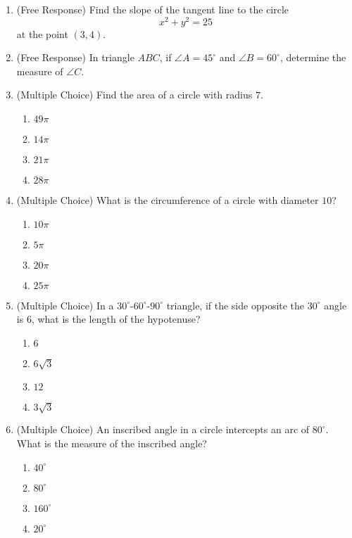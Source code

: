 \documentclass[12pt]{article}
\begin{document}
\begin{enumerate}[label=\textbf{Question \arabic*:}]
  \item (Free Response) Find the slope of the tangent line to the circle
    \[
    x^2 + y^2 = 25
    \]
    at the point \((3,4)\).
    
  \item (Free Response) In triangle \(ABC\), if \(\angle A = 45^\circ\) and \(\angle B = 60^\circ\), determine the measure of \(\angle C\).

  \item (Multiple Choice) Find the area of a circle with radius \(7\).
    \begin{enumerate}[label=(\Alph*)]
      \item \(49\pi\)
      \item \(14\pi\)
      \item \(21\pi\)
      \item \(28\pi\)
    \end{enumerate}
  
  \item (Multiple Choice) What is the circumference of a circle with diameter \(10\)?
    \begin{enumerate}[label=(\Alph*)]
      \item \(10\pi\)
      \item \(5\pi\)
      \item \(20\pi\)
      \item \(25\pi\)
    \end{enumerate}
  
  \item (Multiple Choice) In a \(30^\circ\text{-}60^\circ\text{-}90^\circ\) triangle, if the side opposite the \(30^\circ\) angle is \(6\), what is the length of the hypotenuse?
    \begin{enumerate}[label=(\Alph*)]
      \item \(6\)
      \item \(6\sqrt{3}\)
      \item \(12\)
      \item \(3\sqrt{3}\)
    \end{enumerate}
  
  \item (Multiple Choice) An inscribed angle in a circle intercepts an arc of \(80^\circ\). What is the measure of the inscribed angle?
    \begin{enumerate}[label=(\Alph*)]
      \item \(40^\circ\)
      \item \(80^\circ\)
      \item \(160^\circ\)
      \item \(20^\circ\)
    \end{enumerate}
  

\end{enumerate}
\end{document}
